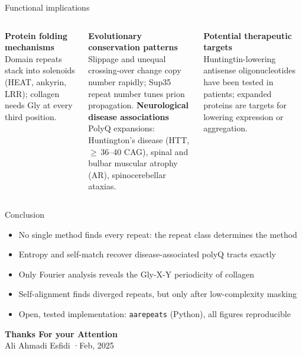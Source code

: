 \documentclass[aspectratio=169,11pt]{beamer}
\begin{document}
\begin{frame}{Functional implications}
\begin{columns}[T]
\textbf{Protein folding mechanisms}\\
\small Domain repeats stack into solenoids (HEAT, ankyrin, LRR); collagen needs Gly at every third position.

\medskip
\normalsize\textbf{Evolutionary conservation patterns}\\
\small Slippage and unequal crossing-over change copy number rapidly; Sup35 repeat number tunes prion propagation.
\textbf{Neurological disease associations}\\
\small PolyQ expansions: Huntington's disease (HTT, $\ge$\,36--40 CAG), spinal and bulbar muscular atrophy (AR), spinocerebellar ataxias.

\medskip
\normalsize\textbf{Potential therapeutic targets}\\
\small Huntingtin-lowering antisense oligonucleotides have been tested in patients; expanded proteins are targets for lowering expression or aggregation.
\end{columns}
\end{frame}

\begin{frame}{Conclusion}
\begin{itemize}
  \item No single method finds every repeat: \alert{the repeat class determines the method}
  \item Entropy and self-match recover disease-associated polyQ tracts exactly
  \item Only Fourier analysis reveals the Gly-X-Y periodicity of collagen
  \item Self-alignment finds diverged repeats, but only after \alert{low-complexity masking}
  \item Open, tested implementation: \texttt{aarepeats} (Python), all figures reproducible
\end{itemize}
\end{frame}

{
\begin{frame}[plain]
\centering\vfill
{\color{paper}\Huge\bfseries Thanks For your Attention}\\[1.2em]
{\color{accent!60}\large Ali Ahmadi Esfidi \quad·\quad Feb, 2025}
\vfill
\end{frame}}
\end{document}
